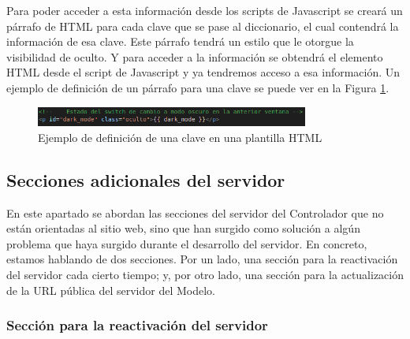 Para poder acceder a esta información desde los scripts de Javascript se creará un párrafo de HTML para cada clave que se pase al diccionario, el cual contendrá la información de esa clave. Este párrafo tendrá un estilo que le otorgue la visibilidad de oculto. Y para acceder a la información se obtendrá el elemento HTML desde el script de Javascript y ya tendremos acceso a esa información. Un ejemplo de definición de un párrafo para una clave se puede ver en la Figura \ref{fig:def_clave_jinja}.

\begin{figure}[h]
\centering
\includegraphics[width=0.8\textwidth]{imagenes/07_Implementacion/def_clave_jinja.png}
\caption{Ejemplo de definición de una clave en una plantilla HTML}
\label{fig:def_clave_jinja}
\end{figure}

\subsection{Secciones adicionales del servidor}

En este apartado se abordan las secciones del servidor del Controlador que no están orientadas al sitio web, sino que han surgido como solución a algún problema que haya surgido durante el desarrollo del servidor. En concreto, estamos hablando de dos secciones. Por un lado, una sección para la reactivación del servidor cada cierto tiempo; y, por otro lado, una sección para la actualización de la URL pública del servidor del Modelo.

\subsubsection*{Sección para la reactivación del servidor}

